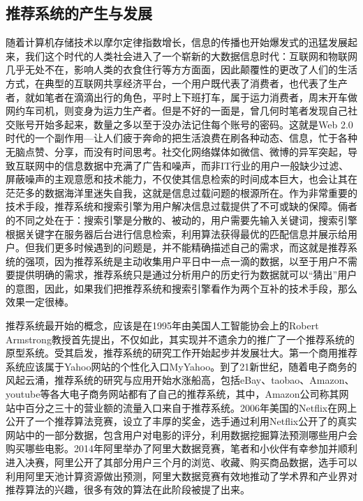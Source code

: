 	\subsection{推荐系统的产生与发展}
	随着计算机存储技术以摩尔定律指数增长，信息的传播也开始爆发式的迅猛发展起来，我们这个时代的人类社会进入了一个崭新的大数据信息时代：互联网和物联网几乎无处不在，影响人类的衣食住行等方方面面，因此颠覆性的更改了人们的生活方式，在典型的互联网共享经济平台，一个用户既代表了消费者，也代表了生产者，就如笔者在滴滴出行的角色，平时上下班打车，属于运力消费者，周末开车做网约车司机，则变身为运力生产者。但是不好的一面是，曾几何时笔者发现自己社交账号开始多起来，数量之多以至于没办法记住每个账号的密码。这就是Web 2.0时代的一个副作用---让人们疲于奔命的把生活浪费在刷各种动态、信息，忙于各种无脑点赞、分享，而没有时间思考。社交化网络媒体如微信、微博的异军突起，导致互联网中的信息数据中充满了广告和噪声，而非IT行业的用户一般缺少过滤、屏蔽噪声的主观意愿和技术能力，不仅使其信息检索的时间成本巨大，也会让其在茫茫多的数据海洋里迷失自我，这就是信息过载问题的根源所在\citep{info-overload, info-overload:1}。作为非常重要的技术手段，推荐系统和搜索引擎为用户解决信息过载提供了不可或缺的保障。倆者的不同之处在于：搜索引擎是分散的、被动的，用户需要先输入关键词，搜索引擎根据关键字在服务器后台进行信息检索，利用算法获得最优的匹配信息并展示给用户。但我们更多时候遇到的问题是，并不能精确描述自己的需求，而这就是推荐系统的强项，因为推荐系统是主动收集用户平日中一点一滴的数据，以至于用户不需要提供明确的需求，推荐系统只是通过分析用户的历史行为数据就可以“猜出”用户的意图，因此，如果我们把推荐系统和搜索引擎看作为两个互补的技术手段，那么效果一定很棒。

	推荐系统最开始的概念，应该是在1995年由美国人工智能协会\citep{recmd-history}上的Robert Armstrong教授首先提出，不仅如此，其实现并不遗余力的推广了一个推荐系统的原型系统。受其启发，推荐系统的研究工作开始起步并发展壮大。第一个商用推荐系统应该属于Yahoo网站的个性化入口MyYahoo。到了21新世纪，随着电子商务的风起云涌，推荐系统的研究与应用开始水涨船高，包括eBay、taobao、Amazon、youtube\citep{recmd-youtube}等各大电子商务网站都有了自己的推荐系统，其中，Amazon公司称其网站中百分之三十的营业额的流量入口来自于推荐系统。2006年美国的Netflix\citep{recmd-netflix}在网上公开了一个推荐算法竞赛，设立了丰厚的奖金，选手通过利用Netflix公开了的真实网站中的一部分数据，包含用户对电影的评分，利用数据挖掘算法预测哪些用户会购买哪些电影。2014年阿里举办了阿里大数据竞赛，笔者和小伙伴有幸参加并顺利进入决赛，阿里公开了其部分用户三个月的浏览、收藏、购买商品数据，选手可以利用阿里天池计算资源做出预测，阿里大数据竞赛有效地推动了学术界和产业界对推荐算法的兴趣，很多有效的算法在此阶段被提了出来。


